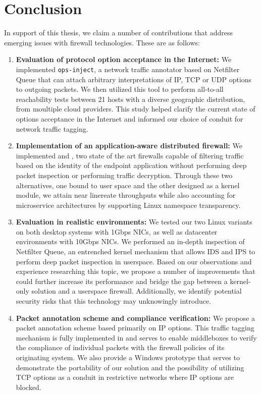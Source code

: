\chapter{Conclusion}

In support of this thesis, we claim a number of contributions that address
emerging issues with firewall technologies. These are as follows:

\begin{enumerate}
    \item \textbf{Evaluation of protocol option acceptance in the Internet:}
    We implemented \texttt{ops-inject}, a network
    traffic annotator based on Netfilter Queue that can attach arbitrary
    interpretations of IP, TCP or UDP options to outgoing packets. We then
    utilized this tool to perform all-to-all reachability tests between 21
    hosts with a diverse geographic distribution, from moultiple cloud providers.
    This study helped clarify the current state of options acceptance in the
    Internet and informed our choice of conduit for network traffic tagging.

    \item \textbf{Implementation of an application-aware distributed firewall:}
    We implemented \daf{} and \scout{},
    two state of the art firewalls capable of filtering traffic based on the
    identity of the endpoint application without performing deep packet inspection
    or performing traffic decryption. Through these two alternatives, one
    bound to user space and the other designed as a kernel module, we attain near
    linereate throughputs while also accounting for microservice architectures
    by supporting Linux namespace transparency.

    \item \textbf{Evaluation in realistic environments:} We tested our two Linux
    variants on both desktop systems with 1Gbps NICs, as well as datacenter
    environments with 10Gbps NICs. We performed an in-depth inspection of Netfilter
    Queue, an entrenched kernel mechanism that allows IDS and IPS to perform
    deep packet inspection in userspace. Based on our observations and experience
    researching this topic, we propose a number of
    improvements that could further increase its performance and bridge the gap
    between a kernel-only solution and a userspace firewall. Additionally, we
    identify potential security risks that this technology may unknowingly introduce.

    \item \textbf{Packet annotation scheme and compliance verification:}
    We propose a packet annotation scheme based primarily on IP options. This
    traffic tagging mechanism is fully implemented in \daf{} and serves to
    enable middleboxes to verify the compliance of individual packets with the
    firewall policies of its originating system. We also provide a Windows
    prototype that serves to demonstrate the
    portability of our solution and the possibility of utilizing TCP options as
    a conduit in restrictive networks where IP options are blocked.


\end{enumerate}
